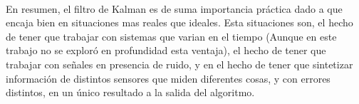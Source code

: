 	\paragraph{}
	En resumen, el filtro de Kalman es de suma importancia práctica dado a que encaja bien en situaciones mas reales que ideales. Esta situaciones son, el hecho de tener que trabajar con sistemas que varian en el tiempo (Aunque en este trabajo no se exploró en profundidad esta ventaja), el hecho de tener que trabajar con señales en presencia de ruido, y en el hecho de tener que sintetizar información de distintos sensores que miden diferentes cosas, y con errores distintos, en un único resultado a la salida del algoritmo.
